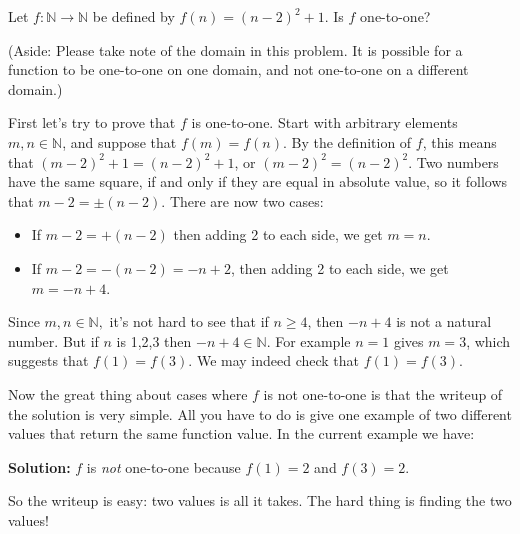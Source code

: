 \begin{example}{}
Let $f\colon \mathbb{N} \to \mathbb{N}$ be defined by $f(n)=(n-2)^2 + 1$.  Is $f$ one-to-one?
\medskip

(Aside: Please take note of the domain in this problem. It is possible for a function to be one-to-one on one domain, and not one-to-one on a different domain.)

First let's try to prove that $f$ is one-to-one.   
Start with arbitrary elements $m, n \in \mathbb{N}$, and suppose that $f(m)=f(n)$.  By the definition of $f$, this means that $(m-2)^2 + 1=(n-2)^2 + 1$, or $(m-2)^2 =(n-2)^2 $.  Two numbers have the same square, if and only if they are equal in absolute value, so it follows that $m-2 = \pm (n-2)$.  There are now two cases:
\begin{itemize}
\item
If $m-2=+(n-2)$ then adding 2 to each side, we get $m=n$.  
\item
If $m-2 = -(n-2) = -n+2$, then adding 2 to each side, we get $m=-n+4$.  
\end{itemize}
Since $m,n \in \mathbb{N},$ it's not hard to see that if $n \ge 4$, then $-n+4$ is not a natural number.  But if $n$ is 1,2,3 then $-n+4 \in \mathbb{N}$. For example $n=1$ gives $m = 3$, which suggests that $f(1) = f(3)$. We may indeed check that  $f(1) = f(3)$. 

Now the great thing about cases where $f$ is not one-to-one is that  the writeup of the solution is very simple. All you have to do is give one example of two different values that return the same function value. In the current example we have: 
\medskip

{\bf Solution:} $f$ is \emph{not} one-to-one because $f(1) = 2$ and $f(3) = 2$. 
\medskip

\noindent  
So the writeup is easy: two values is all it takes. The hard thing is finding the two values!
\end{example}

